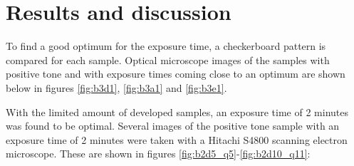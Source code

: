 \section*{Results and discussion}

To find a good optimum for the exposure time, a checkerboard pattern is compared for each sample. Optical microscope images of the samples with positive tone and with exposure times coming close to an optimum are shown  below in figures \ref{fig:b3d1}, \ref{fig:b3a1} and \ref{fig:b3e1}.

With the limited amount of developed samples, an exposure time of 2 minutes was found to be optimal. Several images of the positive tone sample with an exposure time of 2 minutes were taken with a Hitachi S4800 scanning electron microscope. These are shown in figures \ref{fig:b2d5_q5}-\ref{fig:b2d10_q11}:


